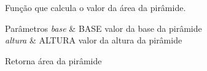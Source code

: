 Função que calcula o valor da área da pirâmide. 


\begin{DoxyParams}{Parâmetros}
{\em base} & B\+A\+SE valor da base da pirâmide \\
\hline
{\em altura} & A\+L\+T\+U\+RA valor da altura da pirâmide \\
\hline
\end{DoxyParams}
\begin{DoxyReturn}{Retorna}
área da pirâmide 
\end{DoxyReturn}
